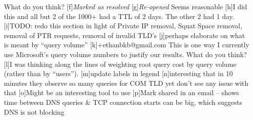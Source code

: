 \documentclass[sigconf,nonacm,10pt]{acmart}
\begin{document}
What do you think? {[}f{]}\emph{Marked as resolved}
{[}g{]}\emph{Re-opened} Seems reasonable {[}h{]}I did this and all but 2
of the 1000+ had a TTL of 2 days. The other 2 had 1 day. {[}i{]}TODO:
redo this section in light of Private IP removal, Squat Space removal,
removal of PTR requests, removal of invalid TLD's {[}j{]}perhaps
elaborate on what is meant by ``query volume''
{[}k{]}+ethanbkb@gmail.com This is one way I currently use Microsoft's
query volume numbers to justify our results. What do you think? {[}l{]}I
was thinking along the lines of weighting root query cost by query
volume (rather than by ``users''). {[}m{]}update labels in legend
{[}n{]}interesting that in 10 minutes they observe so many queries for
COM TLD yet don't see any issue with that {[}o{]}Might be an interesting
tool to use {[}p{]}Mark shared in an email -- shows time between DNS
queries \& TCP connection starts can be big, which suggests DNS is not
blocking


\end{document}
